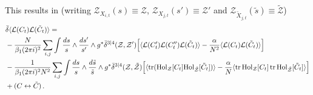 \documentclass[12pt]{article}
\def \tr {\mathop{\rm tr}\nolimits}
\numberwithin{equation}{section}
\begin{document}
This results in (writing $\mathcal{Z}_{X_{i,t}}(s) \equiv \mathcal{Z}$, $\mathcal{Z}_{X_{j,t}}(s') \equiv \mathcal{Z}'$ and $\mathcal{Z}_{\tilde{X}_{j,t}}(\tilde{s}) \equiv \tilde{\mathcal{Z}}$)
\begin{align}
&\bar{\delta} \langle \mathcal{L}(C_t) \mathcal{L}(\tilde{C}_t)\rangle = \notag \\
&-\frac{N}{\beta_1 (2 \pi i)^2} \sum_{i,j} \int  \frac{ds}{s} \wedge\frac{ds'}{s'} \wedge g^* \bar{\delta}^{3|4}(\mathcal{Z},\mathcal{Z'})
\Bigl[ \langle \mathcal{L}(C^\prime_t) \mathcal{L}(C^{\prime \prime}_t) \mathcal{L}(\tilde{C}_t)\rangle - \frac{\alpha}{N^2} \langle \mathcal{L}(C_t) \mathcal{L}(\tilde{C}_t)\rangle\Bigr]  \notag \\
&-\frac{1}{\beta_1 (2 \pi i)^2 N^2} \sum_{i,j} \int  \frac{ds}{s} \wedge\frac{d\tilde{s}}{\tilde{s}} \wedge g^* \bar{\delta}^{3|4}(\mathcal{Z},\tilde{\mathcal{Z}})
\Bigl[ \langle \tr ({\rm Hol}_{\mathcal{Z}}[C_t] {\rm Hol}_{\tilde{\mathcal{Z}}}[\tilde{C}_t])\rangle - \frac{\alpha}{N} \langle \tr {\rm Hol}_{\mathcal{Z}}[C_t] \tr {\rm Hol}_{\tilde{\mathcal{Z}}}[\tilde{C}_t]\rangle \Bigr] \notag \\
& + (C \leftrightarrow \tilde{C}) \,.
\end{align}
\end{document}
